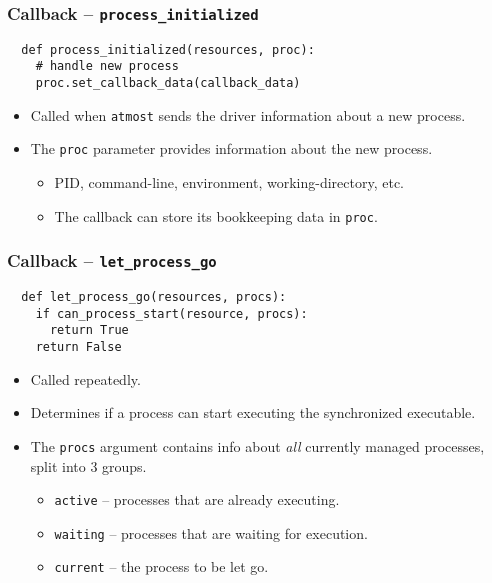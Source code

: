 \documentclass[compress,table,xcolor=table]{beamer}
\newcommand{\shelltext}[1]{\texttt{\colorbox{light-gray}{#1}}}
\begin{document}
\begin{frame}[fragile]
  \frametitle{Callback -- \shelltext{process\_initialized}}
  \begin{lstlisting}
  def process_initialized(resources, proc):
    # handle new process
    proc.set_callback_data(callback_data)
  \end{lstlisting}
  \begin{itemize}
    \Large
    \item Called when \shelltext{atmost} sends the driver information about a
      new process.
    \item The \shelltext{proc} parameter provides information about the new process.
    \begin{itemize}
      \normalsize
      \item PID, command-line, environment, working-directory, etc.
      \item The callback can store its bookkeeping data in \shelltext{proc}.
    \end{itemize}
  \end{itemize}
\end{frame}
\begin{frame}[fragile]
  \frametitle{Callback -- \shelltext{let\_process\_go}}
  \begin{lstlisting}
  def let_process_go(resources, procs):
    if can_process_start(resource, procs):
      return True
    return False
  \end{lstlisting}
  \begin{itemize}
    \Large
    \item Called repeatedly.
    \item Determines if a process can start executing the synchronized executable.
    \item The \shelltext{procs} argument contains info about {\em all} currently
      managed processes, split into 3 groups.
    \begin{itemize}
      \large
      \item \shelltext{active} -- processes that are already executing.
      \item \shelltext{waiting} -- processes that are waiting for execution.
      \item \shelltext{current} -- the process to be let go.
    \end{itemize}
  \end{itemize}
\end{frame}
\end{document}

